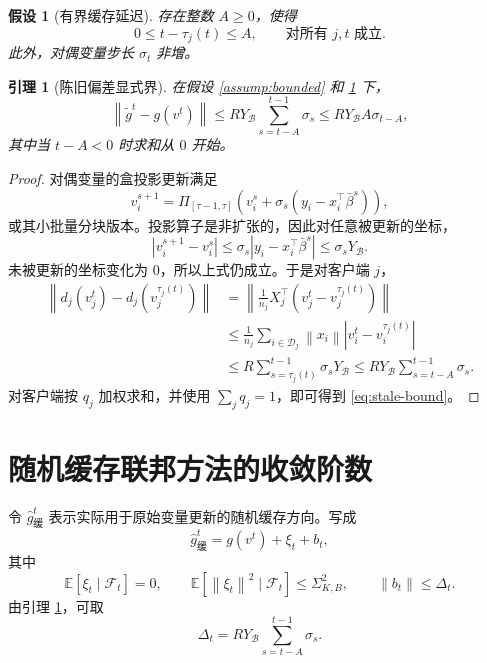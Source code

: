 \documentclass[UTF8,a4paper,11pt]{ctexart}
\newtheorem{assumption}{假设}
\newtheorem{lemma}{引理}
\newcommand{\E}{\mathbb{E}}
\newcommand{\B}{\mathcal{B}}
\newcommand{\F}{\mathcal{F}}
\newcommand{\norm}[1]{\left\|#1\right\|}
\begin{document}
\begin{assumption}[有界缓存延迟]
\label{assump:delay}
存在整数 $A\ge 0$，使得
\[
    0\le t-\tau_j(t)\le A,
    \qquad
    \text{对所有 }j,t\text{ 成立}.
\]
此外，对偶变量步长 $\sigma_t$ 非增。
\end{assumption}

\begin{lemma}[陈旧偏差显式界]
\label{lem:stale}
在假设 \ref{assump:bounded} 和 \ref{assump:delay} 下，
\begin{equation}
    \norm{\widetilde g^t-g(v^t)}
    \le
    RY_\B
    \sum_{s=t-A}^{t-1}\sigma_s
    \le
    RY_\B A\sigma_{t-A},
    \label{eq:stale-bound}
\end{equation}
其中当 $t-A<0$ 时求和从 $0$ 开始。
\end{lemma}

\begin{proof}
对偶变量的盒投影更新满足
\[
    v_i^{s+1}
    =
    \Pi_{[\tau-1,\tau]}
    \left(
        v_i^s+\sigma_s(y_i-x_i^\top\bar\beta^s)
    \right),
\]
或其小批量分块版本。投影算子是非扩张的，因此对任意被更新的坐标，
\[
    |v_i^{s+1}-v_i^s|
    \le
    \sigma_s |y_i-x_i^\top\bar\beta^s|
    \le
    \sigma_s Y_\B.
\]
未被更新的坐标变化为 $0$，所以上式仍成立。于是对客户端 $j$，
\begin{align*}
    \norm{d_j(v_j^t)-d_j(v_j^{\tau_j(t)})}
    &=
    \left\|
    \frac{1}{n_j}
    X_j^\top
    (v_j^t-v_j^{\tau_j(t)})
    \right\|  \\
    &\le
    \frac{1}{n_j}
    \sum_{i\in\mathcal{D}_j}
    \norm{x_i}
    |v_i^t-v_i^{\tau_j(t)}| \\
    &\le
    R\sum_{s=\tau_j(t)}^{t-1}\sigma_s Y_\B
    \le
    RY_\B\sum_{s=t-A}^{t-1}\sigma_s .
\end{align*}
对客户端按 $q_j$ 加权求和，并使用 $\sum_j q_j=1$，即可得到 \eqref{eq:stale-bound}。
\end{proof}

\section{随机缓存联邦方法的收敛阶数}

令 $\widehat g^t_{\text{缓}}$ 表示实际用于原始变量更新的随机缓存方向。写成
\[
    \widehat g^t_{\text{缓}}
    =
    g(v^t)
    +
    \xi_t
    +
    b_t,
\]
其中
\[
    \E[\xi_t\mid\F_t]=0,
    \qquad
    \E[\norm{\xi_t}^2\mid\F_t]\le \Sigma_{K,B}^2,
    \qquad
    \norm{b_t}\le \Delta_t.
\]
由引理 \ref{lem:stale}，可取
\[
    \Delta_t
    =
    RY_\B\sum_{s=t-A}^{t-1}\sigma_s.
\]
\end{document}

